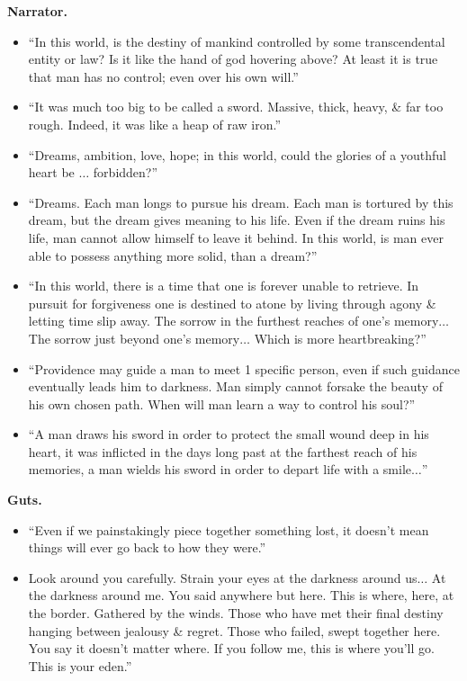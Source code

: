 \documentclass{article}
\begin{document}
\begin{enumerate}
    \textbf{Narrator.}
   	\begin{itemize}
   		\item ``In this world, is the destiny of mankind controlled by some transcendental entity or law? Is it like the hand of god hovering above? At least it is true that man has no control; even over his own will.''
   		\item ``It was much too big to be called a sword. Massive, thick, heavy, \& far too rough. Indeed, it was like a heap of raw iron.''
   		\item ``Dreams, ambition, love, hope; in this world, could the glories of a youthful heart be $\ldots$ forbidden?''
   		\item ``Dreams. Each man longs to pursue his dream. Each man is tortured by this dream, but the dream gives meaning to his life. Even if the dream ruins his life, man cannot allow himself to leave it behind. In this world, is man ever able to possess anything more solid, than a dream?''
   		\item ``In this world, there is a time that one is forever unable to retrieve. In pursuit for forgiveness one is destined to atone by living through agony \& letting time slip away. The sorrow in the furthest reaches of one's memory$\ldots$ The sorrow just beyond one's memory$\ldots$ Which is more heartbreaking?''
   		\item ``Providence may guide a man to meet 1 specific person, even if such guidance eventually leads him to darkness. Man simply cannot forsake the beauty of his own chosen path. When will man learn a way to control his soul?''
   		\item ``A man draws his sword in order to protect the small wound deep in his heart, it was inflicted in the days long past at the farthest reach of his memories, a man wields his sword in order to depart life with a smile$\ldots$''
   	\end{itemize}
    \textbf{Guts.}
    \begin{itemize}
    	\item ``Even if we painstakingly piece together something lost, it doesn't mean things will ever go back to how they were.''
    	\item Look around you carefully. Strain your eyes at the darkness around us$\ldots$ At the darkness around me. You said anywhere but here. This is where, here, at the border. Gathered by the winds. Those who have met their final destiny hanging between jealousy \& regret. Those who failed, swept together here. You say it doesn't matter where. If you follow me, this is where you'll go. This is your eden.''

\end{itemize}
\end{enumerate}
\end{document}
